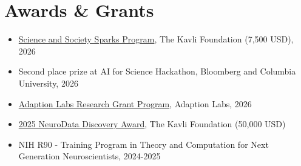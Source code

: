 \documentclass[10pt,letterpaper]{article}
\begin{document}
\section{Awards \& Grants}
\begin{itemize}

\item  
\href{https://www.kavlifoundation.org/science-and-society/special-projects/kavli-sparks-program}{Science and Society Sparks Program}, The Kavli Foundation (7,500 USD), 2026

\item  
Second place prize at AI for Science Hackathon, Bloomberg and Columbia University, 2026

\item  
\href{https://www.adaptionlabs.ai/blog/adaption-research-grant-program}{Adaption Labs Research Grant Program}, Adaption Labs, 2026
\item  
\href{https://www.kavlifoundation.org/}{2025 NeuroData Discovery Award}, The Kavli Foundation (50,000 USD)


\item  NIH R90 - Training Program in Theory and Computation for Next Generation Neuroscientists, 2024-2025


\end{itemize}
\end{document}
